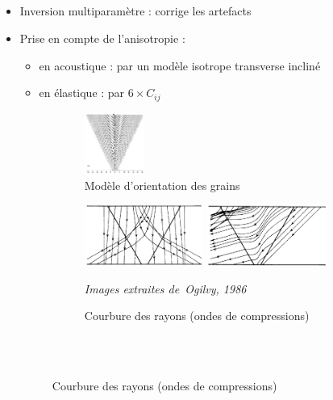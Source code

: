 \documentclass[10pt,xcolor=x11names,compress, notes=show]{beamer}%
\begin{document}
\subsection*{}
\begin{frame}{\insertsectionhead}
\setlength{\leftmargin}{-1cm}
\setlength{\rightmargin}{-1cm}

	\begin{itemize}
		\item<1-> Inversion multiparamètre : corrige les artefacts
		\item<2-> Prise en compte de l'anisotropie : 
		\begin{itemize}
			\item en acoustique : par un modèle isotrope transverse incliné
			\item en élastique : par $6\times C_{ij}$
		\end{itemize} 
		\begin{figure}[!h]
		    \centering
		    \hspace{-1cm}\begin{subfigure}[b]{0.25\textwidth}
		    	\centering
		 		\includegraphics[height=2cm]{img/ogilvy_model.png}
		 		\vspace{0.2cm}\caption{\centering \scriptsize Modèle d'orientation des grains}
			\end{subfigure}
			\begin{subfigure}[b]{0.7\textwidth}
				\centering
		 		\includegraphics[height=2cm]{img/ogilvy_ray1.png}
		 		\includegraphics[height=2cm]{img/ogilvy_ray2.png}\\
		 		\raggedright{\vspace{-0.25cm}\tiny{\itshape Images extraites de~Ogilvy, 1986}}
		 		\caption{\scriptsize Courbure des rayons (ondes de compressions) \\~}
			\end{subfigure}\\
				

\end{figure}
\end{itemize}
\end{frame}
\end{document}
